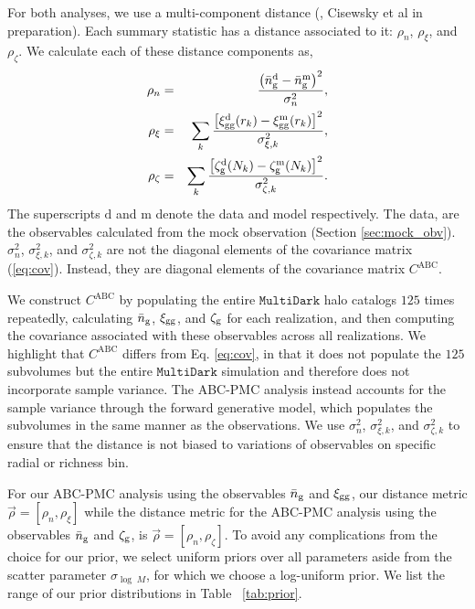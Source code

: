 For both analyses, we use a multi-component distance (\citealt{silk12}, Cisewsky et al in preparation). 
Each summary statistic has a distance associated to it: $\rho_{n}$, $\rho_{\xi}$, and $\rho_{\zeta}$. 
We calculate each of these distance components as,   
\begin{eqnarray}
\rho_{n} &=& \frac{\left(\bar{n}_{\mathrm{g}}^\mathrm{d} - \bar{n}_{\mathrm{g}}^\mathrm{m} \right)^{2}}{\sigma^{2}_{n}}, \label{dn}\\
\rho_{\xi} &=& \sum_{k} \frac{\left[\xi_{\mathrm{gg}}^\mathrm{d}(r_k) - \xi_{\mathrm{gg}}^\mathrm{m}(r_k) \right]^{2}}{\sigma_{\xi,k}^{2}}, \label{dxi} \\
\rho_{\zeta} &=& \sum_{k} \frac{\left[\mathcal{\zeta}_{\rm g}^\mathrm{d}(N_k) - \mathcal{\zeta}_{\rm g}^\mathrm{m}(N_k) \right]^{2}}{\sigma_{\zeta,k}^{2}}. \label{dgmf}
\end{eqnarray}
The superscripts $\mathrm{d}$ and $\mathrm{m}$ denote the data and model respectively. The data, 
are the observables calculated from the mock observation (Section \ref{sec:mock_obv}). 
$\sigma_{n}^{2}$, $\sigma_{\xi,k}^{2}$, and $\sigma_{\zeta,k}^{2}$ are not the diagonal elements 
of the covariance matrix (\ref{eq:cov}). Instead, they are diagonal elements of the covariance matrix 
$C^\mathrm{ABC}$. 

We construct $C^\mathrm{ABC}$ by populating the entire $\mathtt{MultiDark}$ halo catalogs $125$ times 
repeatedly, calculating $\bar{n}_{\mathrm{g}}$, $\xi_{\mathrm{gg}}$, and $\mathcal{\zeta}_{\rm g}$ for each realization, and then computing 
the covariance associated with these observables across all realizations. We highlight that $C^\mathrm{ABC}$ 
differs from Eq. \ref{eq:cov}, in that it does not populate the $125$ subvolumes but the entire 
$\mathtt{MultiDark}$ simulation and therefore does not incorporate sample variance. The ABC-PMC analysis 
instead accounts for the sample variance through the forward generative model, which populates the subvolumes
in the same manner as the observations. We use $\sigma_{n}^{2}$, $\sigma_{\xi,k}^{2}$, and $\sigma_{\zeta,k}^{2}$ 
to ensure that the distance is not biased to variations of observables on specific radial or richness bin. 

For our ABC-PMC analysis using the observables $\bar{n}_{\mathrm{g}}$ and $\xi_{\mathrm{gg}}$, our distance metric 
$\vec\rho = [\rho_n, \rho_\xi]$ while the distance metric for the ABC-PMC analysis using 
the observables $\bar{n}_{\mathrm{g}}$ and $\mathcal{\zeta}_{\rm g}$, is $\vec\rho = [\rho_n, \rho_\zeta]$.
To avoid any complications from the choice for our prior, we select uniform priors over all parameters aside from the scatter parameter $\sigma_{\log\;M}$, for which we choose a log-uniform prior. 
We list the range of our prior distributions in Table ~\ref{tab:prior}.

